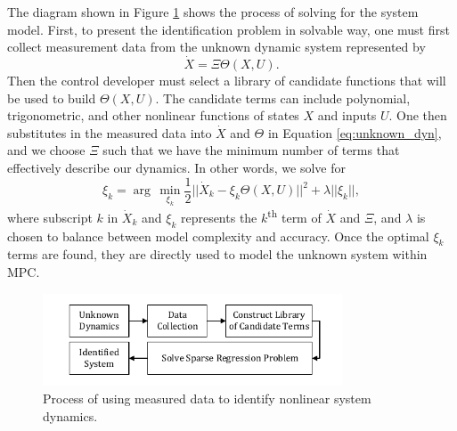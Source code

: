 \documentclass[letterpaper, preprint, paper,11pt]{AAS}	%
\begin{document}
The diagram shown in Figure \ref{fig:SINCYC} shows the process of solving for the system model. First, to present the identification problem in solvable way, one must first collect measurement data from the unknown dynamic system represented by
\begin{equation}
\label{eq:unknown_dyn}
\dot{X} = \Xi\Theta(X,U).
\end{equation}
Then the control developer must select a library of candidate functions that will be used to build $\Theta(X,U)$. The candidate terms can include polynomial, trigonometric, and other nonlinear functions of states $X$ and inputs $U$. One then substitutes in the measured data into $\dot{X}$ and $\Theta$ in Equation \eqref{eq:unknown_dyn}, and we choose $\Xi$ such that we have the minimum number of terms that effectively describe our dynamics. In other words, we solve for  
\begin{equation}
\label{eq:sparse_reg}
\xi_k = \arg\,\min\limits_{\xi_k}\frac{1}{2}||\dot{X}_k-\xi_k\Theta(X,U)||^2+\lambda||\xi_k||, 
\end{equation}
where subscript $k$ in $\dot{X}_k$ and $\xi_k$ represents the $k$\textsuperscript{th} term of $\dot{X}$ and $\Xi$, and $\lambda$ is chosen to balance between model complexity and accuracy. Once the optimal $\xi_k$ terms are found, they are  directly used to model the unknown system within MPC.

\begin{figure}[h!]
	\centering\includegraphics[width=3.5in]{Figures/SINDYC.pdf}
	\caption{Process of using measured data to identify nonlinear system dynamics.}
	\label{fig:SINCYC}
\end{figure}

\end{document}
